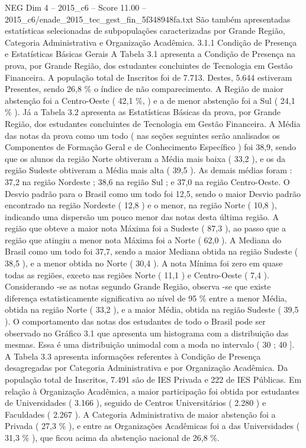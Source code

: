 \begin{textsample}{NEG Dim 4 – 2015\_c6 – Score 11.00 – 2015\_c6/enade\_2015\_tec\_gest\_fin\_5f348948fa.txt}
São também apresentadas estatísticas selecionadas de subpopulações caracterizadas por Grande Região, Categoria Administrativa e Organização Acadêmica. 3.1.1 Condição de Presença e Estatísticas Básicas Gerais A Tabela 3.1 apresenta a Condição de Presença na prova, por Grande Região, dos estudantes concluintes de Tecnologia em Gestão Financeira.
A população total de Inscritos foi de 7.713.
Destes, 5.644 estiveram Presentes, sendo 26,8 \% o índice de não comparecimento.
A Região de maior abstenção foi a Centro-Oeste ( 42,1 \%, ) e a de menor abstenção foi a Sul ( 24,1 \% ).
Já a Tabela 3.2 apresenta as Estatísticas Básicas da prova, por Grande Região, dos estudantes concluintes de Tecnologia em Gestão Financeira.
A Média das notas da prova como um todo ( nas seções seguintes serão analisados os Componentes de Formação Geral e de Conhecimento Específico ) foi 38,9, sendo que os alunos da região Norte obtiveram a Média mais baixa ( 33,2 ), e os da região Sudeste obtiveram a Média mais alta ( 39,5 ).
As demais médias foram : 37,2 na região Nordeste ; 38,6 na região Sul ; e 37,0 na região Centro-Oeste.
O Desvio padrão para o Brasil como um todo foi 12,5, sendo o maior Desvio padrão encontrado na região Nordeste ( 12,8 ) e o menor, na região Norte ( 10,8 ), indicando uma dispersão um pouco menor das notas desta última região.
A região que obteve a maior nota Máxima foi a Sudeste ( 87,3 ), ao passo que a região que atingiu a menor nota Máxima foi a Norte ( 62,0 ).
A Mediana do Brasil como um todo foi 37,7, sendo a maior Mediana obtida na região Sudeste ( 38,5 ), e a menor obtida no Norte ( 30,4 ).
A nota Mínima foi zero em quase todas as regiões, exceto nas regiões Norte ( 11,1 ) e Centro-Oeste ( 7,4 ).
Considerando -se as notas segundo Grande Região, observa -se que existe diferença estatisticamente significativa ao nível de 95 \% entre a menor Média, obtida na região Norte ( 33,2 ), e a maior Média, obtida na região Sudeste ( 39,5 ).
O comportamento das notas dos estudantes de todo o Brasil pode ser observado no Gráfico 3.1 que apresenta um histograma com a distribuição das mesmas.
Essa é uma distribuição unimodal com a moda no intervalo ( 30 ; 40 ].
A Tabela 3.3 apresenta informações referentes à Condição de Presença desagregadas por Categoria Administrativa e por Organização Acadêmica.
Da população total de Inscritos, 7.491 são de IES Privada e 222 de IES Públicas.
Em relação à Organização Acadêmica, a maior participação foi obtida por estudantes de Universidades ( 3.166 ), seguido de Centros Universitários ( 2.280 ) e Faculdades ( 2.267 ).
A Categoria Administrativa de maior abstenção foi a Privada ( 27,3 \% ), e entre as Organizações Acadêmicas foi a das Universidades ( 31,3 \% ), que ficou acima da abstenção nacional de 26,8 \%.

\end{textsample}
